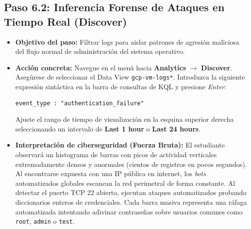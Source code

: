 \documentclass[
  coursetitle={Cómputo Nube y Tecnologías Emergentes},
  coursehours={96},
  coursedate={Verano 2026},
  doctype={Guía de Laboratorio Práctico},
  otherlangs={english,french},
  authorname={Lázaro},
  authorsurname={Bustio-Martínez},
  authortitle={PhD},
  role={Profesor Investigador},
  email={lbustio@inaoe.mx},
  phone={5559504000},
  ext={7459},
  institution={Instituto Nacional de Astrofísica, Óptica y Electrónica (INAOE)},
  department={Maestría en Ciencias en Tecnologías de Seguridad},
  address={Luis Enrique Erro 1, Sta. Ma. Tonantzintla, San Andrés Cholula, CP 72840, Puebla, México},
  margin={0.5in}
]{../../lbustio_lecture_notes}
\begin{document}
\subsection{Paso 6.2: Inferencia Forense de Ataques en Tiempo Real (Discover)}
\begin{itemize}
    \item \textbf{Objetivo del paso:} Filtrar logs para aislar patrones de agresión maliciosa del flujo normal de administración del sistema operativo.
    \item \textbf{Acción concreta:} Navegue en el menú hacia \textbf{Analytics} $\rightarrow$ \textbf{Discover}. Asegúrese de seleccionar el Data View \texttt{gcp-vm-logs*}. Introduzca la siguiente expresión sintáctica en la barra de consultas de KQL y presione \textit{Enter}:
\begin{verbatim}
event_type : "authentication_failure"
\end{verbatim}
    Ajuste el rango de tiempo de visualización en la esquina superior derecha seleccionando un intervalo de \textbf{Last 1 hour} o \textbf{Last 24 hours}.
      
    \item \textbf{Interpretación de ciberseguridad (Fuerza Bruta):} El estudiante observará un histograma de barras con picos de actividad verticales extremadamente densos y anormales (cientos de registros en pocos segundos). Al encontrarse expuesta con una IP pública en internet, los \textit{bots} automatizados globales escanean la red perimetral de forma constante. Al detectar el puerto TCP 22 abierto, ejecutan ataques automatizados probando diccionarios enteros de credenciales. Cada barra masiva representa una ráfaga automatizada intentando adivinar contraseñas sobre usuarios comunes como \texttt{root}, \texttt{admin} o \texttt{test}.
\end{itemize}
\end{document}
